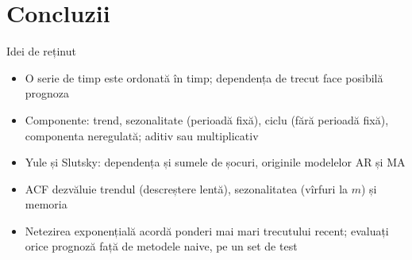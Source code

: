\section{Concluzii}

\begin{frame}{Idei de reținut}
\itemsize{\small}
\begin{itemize}
    \item O serie de timp este ordonată în timp; dependența de trecut face posibilă prognoza
    \item Componente: trend, sezonalitate (perioadă fixă), ciclu (fără perioadă fixă), componenta neregulată; aditiv sau multiplicativ
    \item Yule și Slutsky: dependența și sumele de șocuri, originile modelelor AR și MA
    \item ACF dezvăluie trendul (descreștere lentă), sezonalitatea (vîrfuri la $m$) și memoria
    \item Netezirea exponențială acordă ponderi mai mari trecutului recent; evaluați orice prognoză față de metodele naive, pe un set de test
\end{itemize}
\end{frame}

